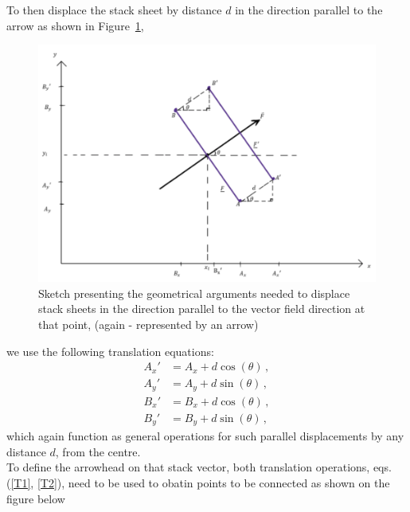 \documentclass[12pt]{report}
\begin{document}
To then displace the stack sheet by distance $d$ in the direction parallel to the arrow as shown in Figure~\ref{fig:parallel disp.},
\begin{figure}[H]
	\centering
	\includegraphics[scale=0.38]{Documentation_images/Geometry of 1 stack sheet, displacement 1}
	\caption{Sketch presenting the geometrical arguments needed to displace stack sheets in the direction parallel to the vector field direction at that point, (again - represented by an arrow)}
	\label{fig:parallel disp.}
\end{figure}
\noindent we use the following translation equations:
\begin{equation}
\label{T2} \begin{split}
A_x' &= A_x + d \cos(\theta)\,, \\
A_y' &= A_y + d \sin(\theta)\,, \\
B_x' &= B_x + d \cos(\theta)\,, \\
B_y' &= B_y + d \sin(\theta)\,, 
\end{split}
\end{equation}
which again function as general operations for such parallel displacements by any distance \( d \), from the centre.\\
To define the arrowhead on that stack vector, both translation operations, eqs. (\ref{T1}, \ref{T2}), need to be used to obatin points to be connected as shown on the figure below
\end{document}
